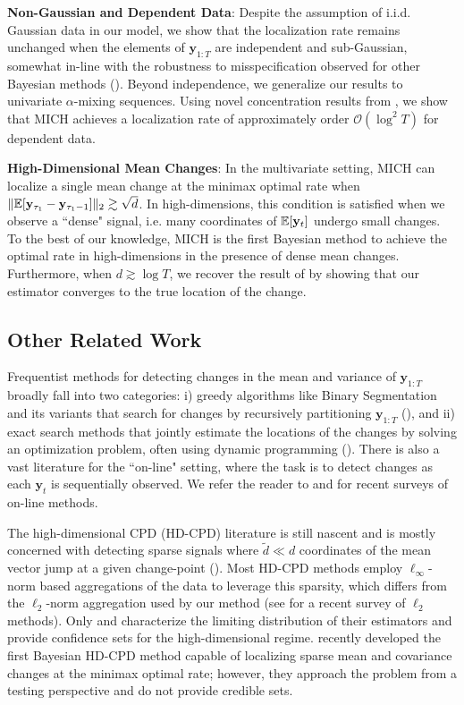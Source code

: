 \textbf{Non-Gaussian and Dependent Data}: Despite the assumption of i.i.d. Gaussian data in our model, we show that the localization rate remains unchanged when the elements of $\mathbf{y}_{1:T}$ are independent and sub-Gaussian, somewhat in-line with the robustness to misspecification observed for other Bayesian methods (\citealp{lai2011simple}). Beyond independence, we generalize our results to univariate $\alpha$-mixing sequences. Using novel concentration results from \cite{Padilla23}, we show that MICH achieves a localization rate of approximately order $\mathcal{O}(\log^2 T)$ for dependent data.

\textbf{High-Dimensional Mean Changes}: In the multivariate setting, MICH can localize a single mean change at the minimax optimal rate when $\lVert\mathbb{E}[\mathbf{y}_{\tau_1} - \mathbf{y}_{\tau_1 - 1}]\rVert_2 \gtrsim \sqrt{d}$. In high-dimensions, this condition is satisfied when we observe a ``dense" signal, i.e. many coordinates of $\mathbb{E}[\mathbf{y}_t]$ undergo small changes. To the best of our knowledge, MICH is the first Bayesian method to achieve the optimal rate in high-dimensions in the presence of dense mean changes. Furthermore, when $d \gtrsim \log T$, we recover the result of \cite{Bai10} by showing that our estimator converges to the true location of the change.

\subsection{Other Related Work}

Frequentist methods for detecting changes in the mean and variance of $\mathbf{y}_{1:T}$ broadly fall into two categories: i) greedy algorithms like Binary Segmentation and its variants that search for changes by recursively partitioning $\mathbf{y}_{1:T}$ (\citealp{Scott74, Sen75, Vostrikova81, Olshen04, Fryzlewicz14, Kovacs22}), and ii) exact search methods that jointly estimate the locations of the changes by solving an optimization problem, often using dynamic programming (\citealp{Auger89, Killick12, Baranowski19, Padilla22}). There is also a vast literature for the ``on-line" setting, where the task is to detect changes as each $\mathbf{y}_t$ is sequentially observed. We refer the reader to \cite{Namoano19} and \cite{Yu02102023} for recent surveys of on-line methods.

The high-dimensional CPD (HD-CPD) literature is still nascent and is mostly concerned with detecting sparse signals where $\tilde{d} \ll d$ coordinates of the mean vector jump at a given change-point (\citealp{Cho14, Jirak15, Wang17, Enikeeva19, Yu20, Chen22}). Most HD-CPD methods employ $\ell_\infty$-norm based aggregations of the data to leverage this sparsity, which differs from the $\ell_2$-norm aggregation used by our method (see \cite{Li23} for a recent survey of $\ell_2$ methods). Only \cite{Jirak15} and \cite{Chen22} characterize the limiting distribution of their estimators and provide confidence sets for the high-dimensional regime. \cite{Kim24} recently developed the first Bayesian HD-CPD method capable of localizing sparse mean and covariance changes at the minimax optimal rate; however, they approach the problem from a testing perspective and do not provide credible sets.

